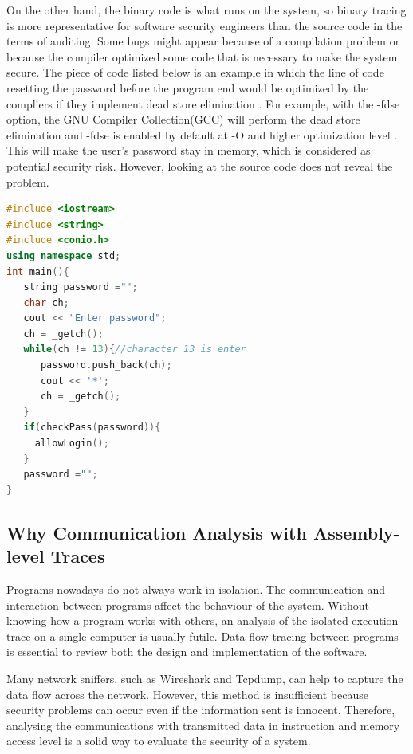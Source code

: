 On the other hand, the binary code is what runs on the system, so binary tracing is more representative for software security engineers than the source code in the terms of auditing. Some bugs might appear because of a compilation problem or because the compiler optimized some code that is necessary to make the system secure. The piece of code listed below is an example in which the line of code resetting the password before the program end would be optimized by the compliers if they implement  dead store elimination \cite{howard2003writing}. For example, with the -fdse option, the GNU Compiler Collection(GCC) will perform the dead store elimination and -fdse is enabled by default at -O and higher optimization level \cite{gcc}. This will make the user's password stay in memory, which is considered as potential security risk. However, looking at the source code does not reveal the problem.

\begin{lstlisting}[language=C++, caption= Password fetching example ]
#include <iostream>
#include <string>
#include <conio.h>
using namespace std;
int main(){
   string password ="";
   char ch;
   cout << "Enter password";
   ch = _getch();
   while(ch != 13){//character 13 is enter
      password.push_back(ch);
      cout << '*';
      ch = _getch();
   }   
   if(checkPass(password)){
     allowLogin();
   }  
   password ="";
}
\end{lstlisting}

\subsection{Why Communication Analysis with Assembly-level Traces}
Programs nowadays do not always work in isolation. The communication and interaction between programs affect the behaviour of the system. Without knowing how a program works with others, an analysis of the isolated execution trace on a single computer is usually futile. Data flow tracing between programs is essential to review both the design and implementation of the software.

Many network sniffers, such as Wireshark\cite{_wireshark_????} and Tcpdump\cite{tcpdump_tcpdump/libpcap_????}, can help to capture the data flow across the network. However, this method is insufficient because security problems can occur even if the information sent is innocent. Therefore, analysing the communications with transmitted data in instruction and memory access level is a solid way to evaluate the security of a system.


